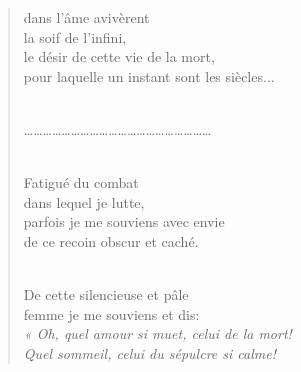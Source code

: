 \documentclass[a4paper,12pt]{book}
\begin{document}
\begin{verse}
dans l'âme avivèrent \\
la soif de l'infini, \\
le désir de cette vie de la mort, \\
pour laquelle un instant sont les siècles... \\ \

\ldots\ldots\ldots\ldots\ldots\ldots\ldots\ldots\ldots\ldots\ldots\ldots\ldots\ldots\ldots\ldots\ldots\ldots\ldots\ldots \\ \

Fatigué du combat \\
dans lequel je lutte, \\
parfois je me souviens avec envie \\
de ce recoin obscur et caché. \\ \

De cette silencieuse et pâle \\
femme je me souviens et dis: \\
{\em « Oh, quel amour si muet, celui de la mort! \\
Quel sommeil, celui du sépulcre si calme!} \\
\end{verse}

\bigskip

\tableofcontents
\end{document}
